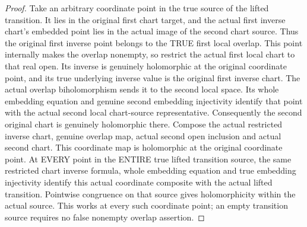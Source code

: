 \begin{proof}
Take an arbitrary coordinate point in the true source of the lifted
transition. It lies in the original first chart target, and the actual
first inverse chart's embedded point lies in the actual image of the
second chart source. Thus the original first inverse point belongs to
the TRUE first local overlap. This point internally makes the overlap
nonempty, so restrict the actual first local chart to that real open.
Its inverse is genuinely holomorphic at the original coordinate point,
and its true underlying inverse value is the original first inverse chart.
The actual overlap biholomorphism sends it to the second local space.
Its whole embedding equation and genuine second embedding injectivity
identify that point with the actual second local chart-source representative.
Consequently the second original chart is genuinely holomorphic there.
Compose the actual restricted inverse chart, genuine overlap map, actual
second open inclusion and actual second chart. This coordinate map is
holomorphic at the original coordinate point. At EVERY point in the ENTIRE
true lifted transition source, the same restricted chart inverse formula,
whole embedding equation and true embedding injectivity identify this
actual coordinate composite with the actual lifted transition. Pointwise
congruence on that source gives holomorphicity within the actual source.
This works at every such coordinate point; an empty transition source
requires no false nonempty overlap assertion.
\end{proof}

